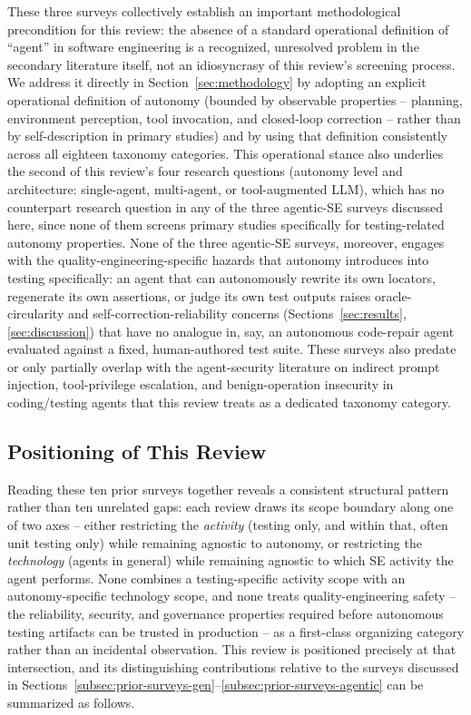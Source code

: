 These three surveys collectively establish an important
methodological precondition for this review: the absence of a
standard operational definition of ``agent'' in software engineering
is a recognized, unresolved problem in the secondary literature
itself, not an idiosyncrasy of this review's screening process. We
address it directly in Section~\ref{sec:methodology} by adopting an
explicit operational definition of autonomy (bounded by observable
properties -- planning, environment perception, tool invocation, and
closed-loop correction -- rather than by self-description in primary
studies) and by using that definition consistently across all
eighteen taxonomy categories. This operational stance also underlies
the second of this review's four research questions (autonomy level
and architecture: single-agent, multi-agent, or tool-augmented LLM),
which has no counterpart research question in any of the three
agentic-SE surveys discussed here, since none of them screens primary
studies specifically for testing-related autonomy properties. None of
the three agentic-SE surveys,
moreover, engages with the quality-engineering-specific hazards that
autonomy introduces into testing specifically: an agent that can
autonomously rewrite its own locators, regenerate its own assertions,
or judge its own test outputs raises oracle-circularity and
self-correction-reliability concerns (Sections~\ref{sec:results},
\ref{sec:discussion}) that have no analogue in, say, an autonomous
code-repair agent evaluated against a fixed, human-authored test
suite. These surveys also predate or only partially overlap with the
agent-security literature on indirect prompt injection, tool-privilege
escalation, and benign-operation insecurity in coding/testing agents
that this review treats as a dedicated taxonomy category.

\subsection{Positioning of This Review}
\label{subsec:positioning-review}

Reading these ten prior surveys together reveals a consistent
structural pattern rather than ten unrelated gaps: each review draws
its scope boundary along one of two axes -- either restricting the
\emph{activity} (testing only, and within that, often unit testing
only) while remaining agnostic to autonomy, or restricting the
\emph{technology} (agents in general) while remaining agnostic to
which SE activity the agent performs. None combines a testing-specific
activity scope with an autonomy-specific technology scope, and none
treats quality-engineering safety -- the reliability, security, and
governance properties required before autonomous testing artifacts
can be trusted in production -- as a first-class organizing category
rather than an incidental observation. This review is positioned
precisely at that intersection, and its distinguishing contributions
relative to the surveys discussed in Sections~\ref{subsec:prior-surveys-gen}--\ref{subsec:prior-surveys-agentic} can be summarized as follows.

